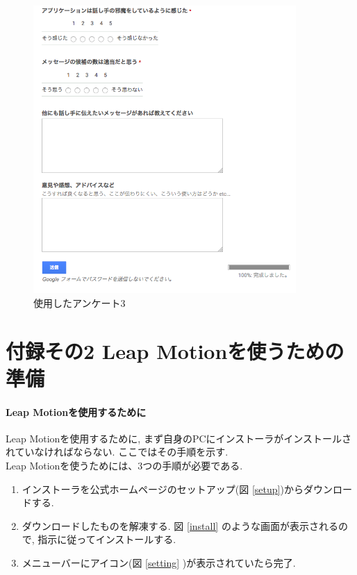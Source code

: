 \documentclass{funthesis}
\begin{document}
 \begin{figure}[H]
 \begin{center}
  \includegraphics[width=100mm]{./img/ank3.png}
 \end{center}
 \caption{使用したアンケート3}
 \label{leap}
\end{figure}


\chapter*{付録その2 Leap Motionを使うための準備}
\subsubsection{Leap Motionを使用するために}
Leap Motionを使用するために, まず自身のPCにインストーラがインストールされていなければならない. ここではその手順を示す.\\



Leap Motionを使うためには、3つの手順が必要である. 
\begin{enumerate}
 \item インストーラを公式ホームページのセットアップ(図 \ref{setup})からダウンロードする.
 \item ダウンロードしたものを解凍する. 図 \ref{install} のような画面が表示されるので, 指示に従ってインストールする. 
 \item メニューバーにアイコン(図 \ref{setting} )が表示されていたら完了. 
\end{enumerate}
\end{document}
